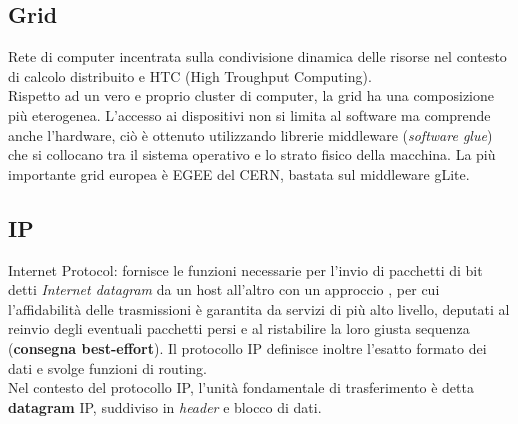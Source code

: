 \documentclass[a4paper,11pt]{article}
\def\sub#1{\subsection{#1}\label{#1}}
\def\vedi#1{\nameref{#1}}
\begin{document}
\sub{Grid}
Rete di computer incentrata sulla condivisione dinamica delle risorse nel contesto di calcolo distribuito e HTC (High Troughput Computing).\\ Rispetto ad un vero e proprio cluster di computer, la grid ha una composizione più eterogenea. L'accesso ai dispositivi non si limita al software ma comprende anche l'hardware, ciò è ottenuto utilizzando librerie middleware (\textit{software glue}) che si collocano tra il sistema operativo e lo strato fisico della macchina. La più importante grid europea è EGEE del CERN, bastata sul middleware gLite.%
 
\newpage
\sub{IP}
Internet Protocol: fornisce le funzioni necessarie per l'invio di pacchetti di bit detti \textit{Internet datagram} da un host all'altro con un approccio \vedi{Connectionless}, per cui l'affidabilità delle trasmissioni è garantita da servizi di più alto livello, deputati al reinvio degli eventuali pacchetti persi e al ristabilire la loro giusta sequenza (\textbf{consegna best-effort}). 
Il protocollo IP definisce inoltre l'esatto formato dei dati e svolge funzioni di routing.
\\Nel contesto del protocollo IP, l'unità fondamentale di trasferimento è detta \textbf{datagram} IP, suddiviso in \textit{header} e blocco di dati.
\end{document}
